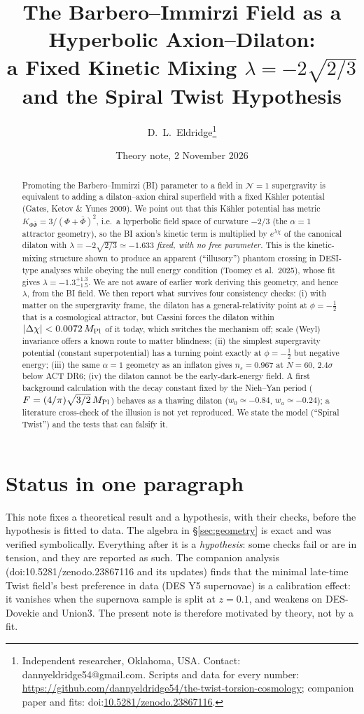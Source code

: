 \documentclass[11pt]{article}
\title{\textbf{The Barbero--Immirzi Field as a Hyperbolic Axion--Dilaton:\\
a Fixed Kinetic Mixing $\lambda=-2\sqrt{2/3}$ and the Spiral Twist Hypothesis}}
\author{D.~L.~Eldridge\thanks{Independent researcher, Oklahoma, USA. Contact: dannyeldridge54@gmail.com.
Scripts and data for every number: \url{https://github.com/dannyeldridge54/the-twist-torsion-cosmology};
companion paper and fits: doi:\href{https://doi.org/10.5281/zenodo.23867116}{10.5281/zenodo.23867116}.}}
\date{Theory note, 2 November 2026}
\newcommand{\Mp}{M_{\rm Pl}}
\begin{document}
\maketitle

\begin{abstract}
Promoting the Barbero--Immirzi (BI) parameter to a field in $\mathcal N=1$ supergravity is equivalent to adding a
dilaton--axion chiral superfield with a fixed K\"ahler potential (Gates, Ketov \& Yunes 2009). We point out that
this K\"ahler potential has metric $K_{\Phi\bar\Phi}=3/(\Phi+\bar\Phi)^2$, i.e.\ a hyperbolic field space of
curvature $-2/3$ (the $\alpha=1$ attractor geometry), so the BI axion's kinetic term is multiplied by
$e^{\lambda\chi}$ of the canonical dilaton with $\lambda=-2\sqrt{2/3}\simeq-1.633$ \emph{fixed, with no free
parameter}. This is the kinetic-mixing structure shown to produce an apparent (``illusory'') phantom crossing in
DESI-type analyses while obeying the null energy condition (Toomey et al.\ 2025), whose fit gives
$\lambda=-1.3^{+1.3}_{-1.5}$. We are not aware of earlier work deriving this geometry, and hence $\lambda$, from the
BI field. We then report what survives four consistency checks: (i) with matter on the supergravity frame, the
dilaton has a general-relativity point at $\phi=-\tfrac12$ that is a cosmological attractor, but Cassini forces the
dilaton within $|\Delta\chi|<0.0072\,\Mp$ of it today, which switches the mechanism off; scale (Weyl) invariance
offers a known route to matter blindness; (ii) the simplest supergravity potential (constant superpotential) has
a turning point exactly at $\phi=-\tfrac12$ but negative energy; (iii) the same $\alpha=1$ geometry as an inflaton
gives $n_s=0.967$ at $N=60$, $2.4\sigma$ below ACT DR6; (iv) the dilaton cannot be the early-dark-energy field.
A first background calculation with the decay constant fixed by the Nieh--Yan period ($F=(4/\pi)\sqrt{3/2}\,\Mp$)
behaves as a thawing dilaton ($w_0\simeq-0.84$, $w_a\simeq-0.24$); a literature cross-check of the illusion is not
yet reproduced. We state the model (``Spiral Twist'') and the tests that can falsify it.
\end{abstract}

\section{Status in one paragraph}
This note fixes a theoretical result and a hypothesis, with their checks, before the hypothesis is fitted to data.
The algebra in \S\ref{sec:geometry} is exact and was verified symbolically. Everything after it is a
\emph{hypothesis}: some checks fail or are in tension, and they are reported as such. The companion analysis
(doi:10.5281/zenodo.23867116 and its updates) finds that the minimal late-time Twist field's best preference in
data (DES Y5 supernovae) is a calibration effect: it vanishes when the supernova sample is split at $z=0.1$, and
weakens on DES-Dovekie and Union3. The present note is therefore motivated by theory, not by a fit.
\end{document}
